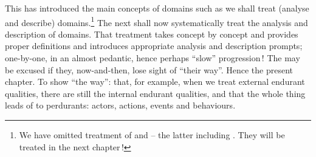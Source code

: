 \begynd
\pind This  has introduced \nyl the main concepts of domains such as
      we shall treat \nyl  (analyse and describe) domains.\footnote{\LLLL We
      have omitted treatment of  and
       -- the latter including . They will
      be treated in the next chapter\,!}
\pind The next  shall now systematically treat \nyl  the
      analysis and description of domains.
\begynd
\pind That treatment takes concept by concept and 
\begynd
\pind provides proper definitions and
\pind introduces appropriate analysis and description prompts;
\pind one-by-one, in an almost pedantic, 
\pind hence perhaps ``slow'' progression\,!
\afslut
\afslut
\mnewfoil
\pind The  may be excused
\begynd
\pind if they, now-and-then, lose sight of ``their way''.
\afslut
\pind Hence the present chapter.
\begynd
\pind To show ``the way'':
\pind that, for example, \nyl when we treat external endurant qualities,
\pind there are still the internal endurant qualities,
\pind and that the whole thing leads of to perdurants:
\begynd
\pind actors,
\pind actions,
\pind events and
\pind behaviours.
\afslut
\afslut
\afslut

\label{chap2.tex.Preview.n}
